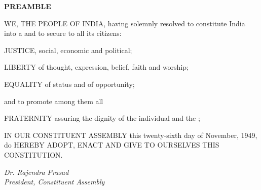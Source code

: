 
{}

\begin{center}
{\LARGE \textbf{PREAMBLE}}
\end{center}

\vspace{1cm}

\begin{center}
\begin{minipage}{0.8\textwidth}
\centering
\large

WE, THE PEOPLE OF INDIA, having solemnly resolved to constitute India into a 
and to secure to all its citizens:

\vspace{0.5cm}

JUSTICE, social, economic and political;

\vspace{0.3cm}

LIBERTY of thought, expression, belief, faith and worship;

\vspace{0.3cm}

EQUALITY of status and of opportunity;

and to promote among them all

\vspace{0.3cm}

FRATERNITY assuring the dignity of the individual and the 
;

\vspace{0.5cm}

IN OUR CONSTITUENT ASSEMBLY this twenty-sixth day of November, 1949, do HEREBY ADOPT, ENACT AND GIVE TO OURSELVES THIS CONSTITUTION.

\end{minipage}
\end{center}

\vspace{2cm}

\begin{flushright}
\textit{Dr. Rajendra Prasad} \\
\textit{President, Constituent Assembly}
\end{flushright}

\cleardoublepage